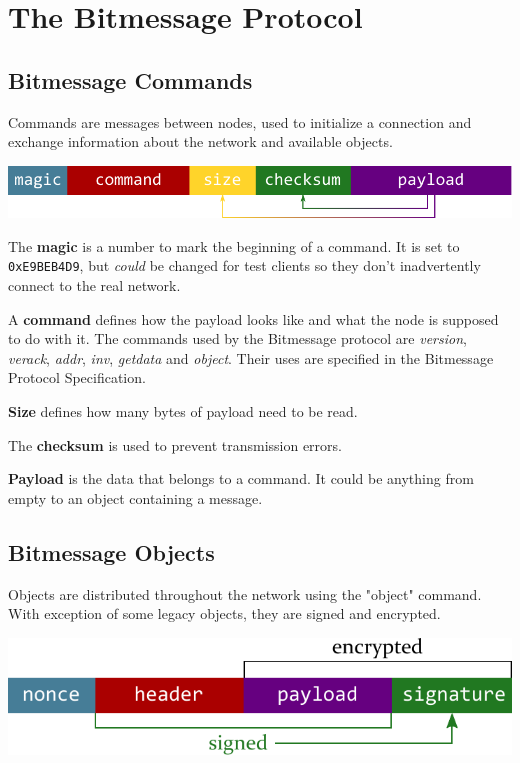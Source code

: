 \documentclass{bfh}
\begin{document}
  \section{The Bitmessage Protocol}

  \subsection{Bitmessage Commands}

  Commands are messages between nodes, used to initialize a connection and exchange information about the network and available objects.

  \includegraphics[width=\textwidth]{images/command.pdf}

  The \textbf{magic} is a number to mark the beginning of a command. It is set to \texttt{0xE9BEB4D9}, but \textit{could} be changed for test clients so they don't inadvertently connect to the real network.

  A \textbf{command} defines how the payload looks like and what the node is supposed to do with it. The commands used by the Bitmessage protocol are \textit{version}, \textit{verack}, \textit{addr}, \textit{inv}, \textit{getdata} and \textit{object}. Their uses are specified in the Bitmessage Protocol Specification.\cite{wiki:protocol}

  \textbf{Size} defines how many bytes of payload need to be read.

  The \textbf{checksum} is used to prevent transmission errors.

  \textbf{Payload} is the data that belongs to a command. It could be anything from empty to an object containing a message.


  \subsection{Bitmessage Objects}
  Objects are distributed throughout the network using the "object" command. With exception of some legacy objects, they are signed and encrypted.

  \includegraphics[width=\textwidth]{images/object.pdf}
\end{document}
